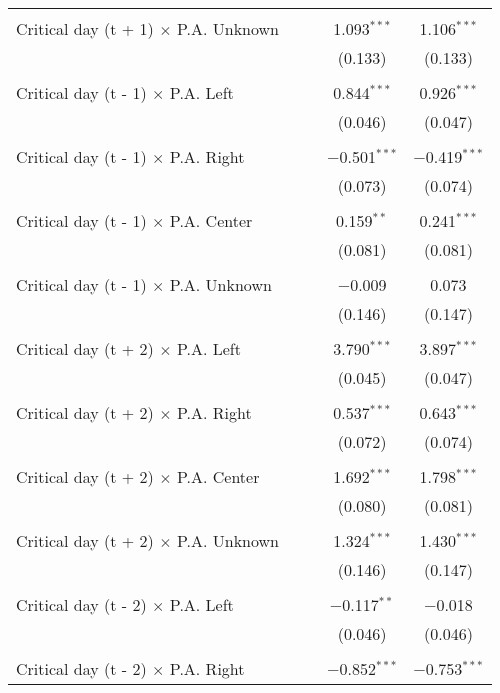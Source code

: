 \documentclass[
]{article}
\begin{document}
\begin{table}[!htbp]
{\begin{tabular}{@{\extracolsep{5pt}}lcccc}
  & & & & \\ 
 Critical day (t + 1) $\times$ P.A. Unknown &  &  & 1.093$^{***}$ & 1.106$^{***}$ \\ 
  &  &  & (0.133) & (0.133) \\ 
  & & & & \\ 
 Critical day (t - 1) $\times$ P.A. Left &  &  & 0.844$^{***}$ & 0.926$^{***}$ \\ 
  &  &  & (0.046) & (0.047) \\ 
  & & & & \\ 
 Critical day (t - 1) $\times$ P.A. Right &  &  & $-$0.501$^{***}$ & $-$0.419$^{***}$ \\ 
  &  &  & (0.073) & (0.074) \\ 
  & & & & \\ 
 Critical day (t - 1) $\times$ P.A. Center &  &  & 0.159$^{**}$ & 0.241$^{***}$ \\ 
  &  &  & (0.081) & (0.081) \\ 
  & & & & \\ 
 Critical day (t - 1) $\times$ P.A. Unknown &  &  & $-$0.009 & 0.073 \\ 
  &  &  & (0.146) & (0.147) \\ 
  & & & & \\ 
 Critical day (t + 2) $\times$ P.A. Left &  &  & 3.790$^{***}$ & 3.897$^{***}$ \\ 
  &  &  & (0.045) & (0.047) \\ 
  & & & & \\ 
 Critical day (t + 2) $\times$ P.A. Right &  &  & 0.537$^{***}$ & 0.643$^{***}$ \\ 
  &  &  & (0.072) & (0.074) \\ 
  & & & & \\ 
 Critical day (t + 2) $\times$ P.A. Center &  &  & 1.692$^{***}$ & 1.798$^{***}$ \\ 
  &  &  & (0.080) & (0.081) \\ 
  & & & & \\ 
 Critical day (t + 2) $\times$ P.A. Unknown &  &  & 1.324$^{***}$ & 1.430$^{***}$ \\ 
  &  &  & (0.146) & (0.147) \\ 
  & & & & \\ 
 Critical day (t - 2) $\times$ P.A. Left &  &  & $-$0.117$^{**}$ & $-$0.018 \\ 
  &  &  & (0.046) & (0.046) \\ 
  & & & & \\ 
 Critical day (t - 2) $\times$ P.A. Right &  &  & $-$0.852$^{***}$ & $-$0.753$^{***}$ \\ 

\end{tabular}}
\end{table}
\end{document}
